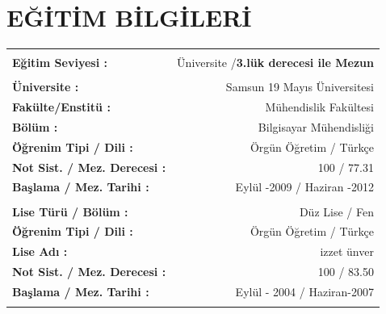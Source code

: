 \documentclass[10pt,a4paper]{article}
\begin{document}
\section{\sc E{\footnotesize Ğ\footnotesize İT\footnotesize İM} B{\footnotesize İLG\footnotesize İLER\footnotesize İ}}
\hspace*{1.6in}\begin{tabular}{lr}
\vspace{0.5 mm}\\
\textbf{Eğitim Seviyesi :} & Üniversite /\textbf{3.lük derecesi ile Mezun} \\
\vspace{0.5 mm}\\
\textbf{Üniversite :} & Samsun 19 Mayıs Üniversitesi \\
\textbf{Fakülte/Enstitü :} & Mühendislik Fakültesi \\
\textbf{Bölüm :} & Bilgisayar Mühendisliği \\
\textbf{Öğrenim Tipi / Dili :} & Örgün Öğretim / Türkçe\\
\textbf{Not Sist. / Mez. Derecesi :} & 100 / 77.31 \\
\textbf{Başlama / Mez. Tarihi :} & Eylül -2009 / Haziran -2012\\
\vspace{0.5 mm}\\
\textbf{Lise Türü / Bölüm :} & Düz Lise / Fen\\
\textbf{Öğrenim Tipi / Dili :} & Örgün Öğretim / Türkçe\\
\textbf{Lise Adı :} & izzet ünver\\
\textbf{Not Sist. / Mez. Derecesi :} & 100 / 83.50\\
\textbf{Başlama / Mez. Tarihi :} & Eylül - 2004 / Haziran-2007\\
\vspace{0.5 mm}\\
\end{tabular}
\end{document}
